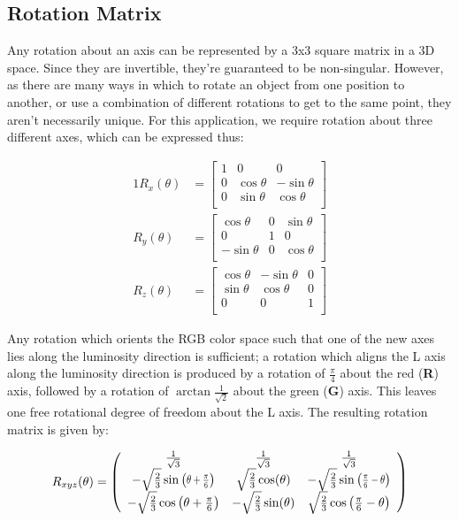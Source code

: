 \subsection{Rotation Matrix}\label{sec:RotationMatrix}
Any rotation about an axis can be represented by a 3x3 square matrix in a 3D space. Since they are invertible, they're guaranteed to be non-singular. However, as there are many ways in which to rotate an object from one position to another, or use a combination of different rotations to get to the same point, they aren't necessarily unique. For this application, we require rotation about three different axes, which can be expressed thus:


\begin{alignat}{1}
R_x(\theta) &= \begin{bmatrix}
1 & 0 & 0 \\
0 & \cos \theta &  -\sin \theta \\[3pt]
0 & \sin \theta  &  \cos \theta \\[3pt]
\end{bmatrix} \\[6pt]
R_y(\theta) &= \begin{bmatrix}
\cos \theta & 0 & \sin \theta \\[3pt]
0 & 1 & 0 \\[3pt]
-\sin \theta & 0 & \cos \theta \\
\end{bmatrix} \\[6pt]
R_z(\theta) &= \begin{bmatrix}
\cos \theta &  -\sin \theta & 0 \\[3pt]
\sin \theta & \cos \theta & 0\\[3pt]
0 & 0 & 1\\
\end{bmatrix}
\end{alignat}


Any rotation which orients the RGB color space such that one of the new axes lies along the luminosity direction is sufficient; a rotation which aligns the L axis along the luminosity direction is produced by a rotation of $\frac{\pi}4$ about the red (\textbf{R}) axis, followed by a rotation of $\arctan{\frac{1}{\sqrt{2}}}$ about the green (\textbf{G}) axis. This leaves one free rotational degree of freedom about the L axis. The resulting rotation matrix is given by:

\begin{equation}
R_{xyz}(\theta) =
\left(
\begin{array}{ccc}
 \frac{1}{\sqrt{3}} & \frac{1}{\sqrt{3}} & \frac{1}{\sqrt{3}} \\
 -\sqrt{\frac{2}{3}} \sine{\theta +\Pii{6} } & \sqrt{\frac{2}{3}} \cos (\theta ) & -\sqrt{\frac{2}{3}} \sine{\Pii{6}-\theta } \\
 -\sqrt{\frac{2}{3}} \cos \left(\theta +\Pii{6}\right) & -\sqrt{\frac{2}{3}} \sin (\theta ) & \sqrt{\frac{2}{3}} \cos \left(\Pii{6}-\theta \right) \\
\end{array}
\right)
\end{equation}



